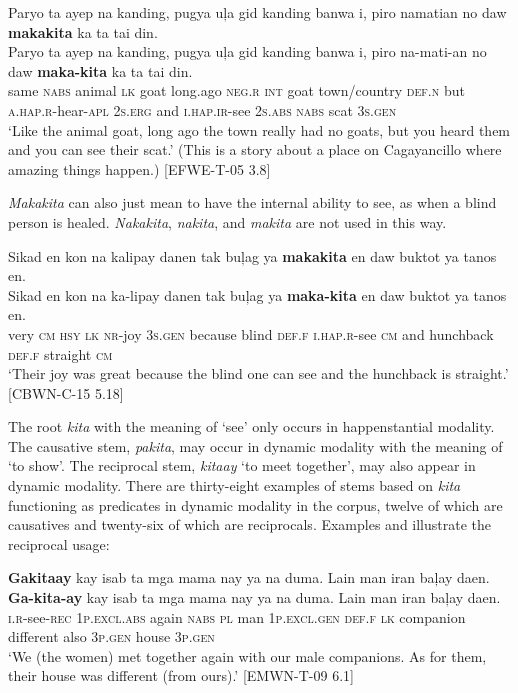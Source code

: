 \ea 
Paryo  ta  ayep  na  kanding,  pugya  uļa  gid  kanding  banwa  i, piro  namatian  no  daw  \textbf{makakita}  ka  ta  tai  din. \\\smallskip
\gll Paryo  ta  ayep  na  kanding,  pugya  uļa  gid  kanding  banwa  i, piro  na-mati-an  no  daw  \textbf{maka-kita}  ka  ta  tai  din. \\
same  \textsc{nabs}  animal  \textsc{lk}  goat  long.ago  \textsc{neg.r}  \textsc{int}  goat  town/country  \textsc{def.n} but  \textsc{a.hap.r}-hear-\textsc{apl}  2\textsc{s.erg}  and  \textsc{i.hap.ir}-see  2\textsc{s.abs}  \textsc{nabs}  scat  3\textsc{s.gen} \\
\glt ‘Like the animal goat, long ago the town really had no goats, but you heard them and you can see their scat.’ (This is a story about a place on Cagayancillo where amazing things happen.) [EFWE-T-05 3.8]
\z

\textit{Makakita} can also just mean to have the internal ability to see, as when a blind person is healed. \textit{Nakakita}, \textit{nakita}, and \textit{makita} are not used in this way. 

\ea 
Sikad  en  kon  na  kalipay  danen  tak  buļag  ya  \textbf{makakita}  en daw  buktot  ya  tanos  en.\\\smallskip
\gll Sikad  en  kon  na  ka-lipay  danen  tak  buļag  ya  \textbf{maka-kita}  en daw  buktot  ya  tanos  en.\\
very  \textsc{cm}  \textsc{hsy}  \textsc{lk}  \textsc{nr}-joy  3\textsc{s.gen}  because  blind  \textsc{def.f}  \textsc{i.hap.r}-see  \textsc{cm} and  hunchback  \textsc{def.f}  straight  \textsc{cm} \\
\glt ‘Their joy was great because the blind one can see and the hunchback is straight.’ [CBWN-C-15 5.18]
\z  

The root \textit{kita} with the meaning of ‘see’ only occurs in happenstantial modality. The causative stem, \textit{pakita}, may occur in dynamic modality with the meaning of ‘to show’. The reciprocal stem, \textit{kitaay} ‘to meet together’, may also appear in dynamic modality. There are thirty-eight examples of stems based on \textit{kita} functioning as predicates in dynamic modality in the corpus, twelve of which are causatives and twenty-six of which are reciprocals. Examples  and  illustrate the reciprocal usage:

\ea 
\label{bkm:Ref121468636}
\textbf{Gakitaay}  kay  isab  ta  mga  mama  nay  ya  na  duma. Lain  man  iran  baļay  daen. \\\smallskip
\gll \textbf{Ga-kita-ay}  kay  isab  ta  mga  mama  nay  ya  na  duma. Lain  man  iran  baļay  daen. \\
\textsc{i.r}-see-\textsc{rec}  1\textsc{p.excl.abs} again  \textsc{nabs}  \textsc{pl}  man 1\textsc{p.excl.gen}  \textsc{def.f}  \textsc{lk} companion different  also  3\textsc{p.gen}  house  3\textsc{p.gen} \\
\glt ‘We (the women) met together again with our male companions. As for them, their house was different (from ours).’ [EMWN-T-09  6.1]
\z 

